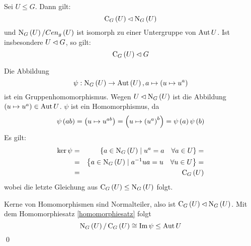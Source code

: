 \begin{satz}
 Sei $U \leq G$. Dann gilt:
 \begin{equation*}
  \operatorname{C}_G\left(U\right) \lhd \operatorname{N}_G\left(U\right)
 \end{equation*}
 und $\operatorname{N}_G\left(U\right)/Cen_g\left(U\right)$ ist isomorph zu einer Untergruppe von $\operatorname{Aut} U$. Ist insbesondere $U \lhd G$, so gilt:
 \begin{equation*}
  \operatorname{C}_G\left(U\right) \lhd G
 \end{equation*}
\end{satz}

\begin{beweis}
 Die Abbildung
 \begin{equation*}
  \psi: \operatorname{N}_G\left(U\right) \to \operatorname{Aut}\left(U\right), a \mapsto \left( u \mapsto u^a\right)
 \end{equation*}
 ist ein Gruppenhomomorphismus. Wegen $U \lhd \operatorname{N}_G\left(U\right)$ ist die Abbildung $\left(u\mapsto u^a\right) \in \operatorname{Aut} U$. $\psi$ ist ein Homomorphismus, da
 \begin{equation*} 
  \psi\left(ab\right)=\left(u \mapsto u^{ab}\right)=\left(u \mapsto \left(u^a\right)^b\right)=\psi\left(a\right)\psi\left(b\right)
 \end{equation*}
 Es gilt:
 \begin{eqnarray*}
  \ker\psi&=&\left\{a \in \operatorname{N}_G\left(U\right) \mid u^a=a \quad \forall a \in U\right\}=\\&=& \left\{a\in \operatorname{N}_G\left(U\right) \mid a^{-1}ua=u \quad \forall u \in U\right\}=\\&=&\operatorname{C}_G\left(U\right)
 \end{eqnarray*}
 wobei die letzte Gleichung aus $\operatorname{C}_G\left(U\right)\leq\operatorname{N}_G\left(U\right)$ folgt.

 Kerne von Homomorphismen sind Normalteiler, also ist $\operatorname{C}_G\left(U\right) \lhd \operatorname{N}_G\left(U\right)$. Mit dem Homomorphiesatz \ref{homomorphiesatz} folgt
 \begin{equation*}
  \operatorname{N}_G\left(U\right)/\operatorname{C}_G\left(U\right) \cong \operatorname{Im}\psi \leq \operatorname{Aut} U
 \end{equation*}
 \qed
\end{beweis}

